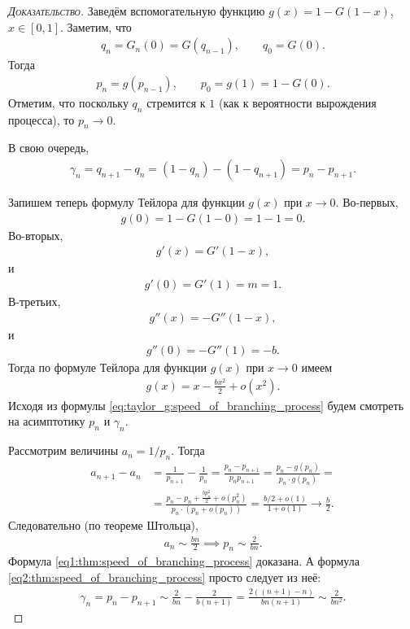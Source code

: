 \documentclass[../main.tex]{subfiles}
\begin{document}
\begin{proof}[\normalfont\textsc{Доказательство}]
 Заведём вспомогательную функцию $ g(x) = 1 - G(1 - x) $, $ x \in [0,1] $. Заметим, что
 \begin{align*}
  q_n = G_n(0) = G(q_{n-1}), \qquad q_0 = G(0).
 \end{align*} Тогда
 \begin{align*}
  p_n = g(p_{n-1}), \qquad p_0 = g(1) = 1 - G(0).
 \end{align*} Отметим, что поскольку $ q_n $ стремится к $ 1 $ (как к вероятности вырождения процесса), то $ p_n \to 0 $.

 В свою очередь,
 \begin{align*}
  \gamma_n = q_{n+1} - q_n = (1 - q_n) - (1 - q_{n+1}) = p_n - p_{n+1}.
 \end{align*}

 Запишем теперь формулу Тейлора для функции $ g(x) $ при $ x \to 0 $. Во-первых,
 \begin{align*}
  g(0) = 1 - G(1 - 0) = 1 - 1 = 0.
 \end{align*} Во-вторых,\begin{align*}
  g'(x) = G'(1-x),
 \end{align*} и \begin{align*}
  g'(0) = G'(1) = m = 1.
 \end{align*} В-третьих,
 \begin{align*}
  g''(x) = -G''(1-x),
 \end{align*} и \begin{align*}
  g''(0) = -G''(1) = -b.
 \end{align*} Тогда по формуле Тейлора для функции $ g(x) $  при $ x \to 0 $ имеем
 \begin{align}
  \label{eq:taylor_g:speed_of_branching_process}
  g(x) = x - \frac{bx^{2}}{2} + o(x^{2}).
 \end{align} Исходя из формулы \eqref{eq:taylor_g:speed_of_branching_process} будем смотреть на асимптотику $ p_n $ и $ \gamma_n $.

 Рассмотрим величины $ a_n = 1 / p_n $. Тогда
 \begin{align*}
  a_{n+1} - a_n &= \frac{1}{p_{n+1}} - \frac{1}{p_n} = \frac{p_n - p_{n+1}}{p_n p_{n+1}} = \frac{p_n - g(p_n)}{p_n \cdot g(p_n)} = \\
  &= \frac{p_n -p_n + \frac{bp_n^{2}}{2} + o(p_n^{2})}{p_n \cdot \left( p_n + o(p_n) \right)} = \frac{b / 2 + o(1)}{1 + o(1)} \to \frac{b}{2}.
 \end{align*} Следовательно (по теореме Штольца),
 \begin{align*}
  a_n \sim \frac{bn}{2} \implies p_n \sim \frac{2}{bn}.
 \end{align*} Формула \eqref{eq1:thm:speed_of_branching_process} доказана. А формула \eqref{eq2:thm:speed_of_branching_process} просто следует из неё:
 \begin{align*}
  \gamma_n = p_n - p_{n+1} \sim \frac{2}{bn} - \frac{2}{b(n+1)} = \frac{2((n+1) - n)}{bn(n+1)} \sim \frac{2}{bn^{2}}.
 \end{align*}
\end{proof}
\end{document}
